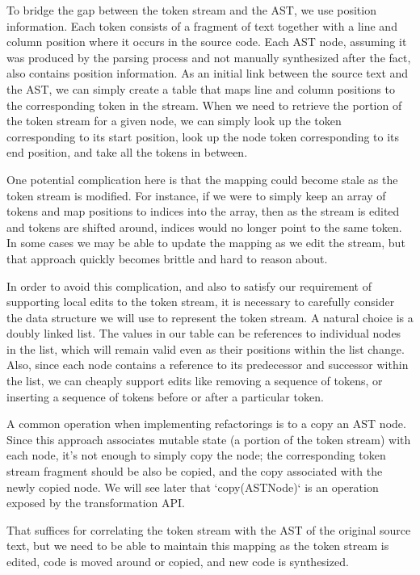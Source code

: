 To bridge the gap between the token stream and the AST, we use position
information. Each token consists of a fragment of text together with a line and
column position where it occurs in the source code. Each AST node, assuming it
was produced by the parsing process and not manually synthesized after the
fact, also contains position information. As an initial link between the source
text and the AST, we can simply create a table that maps line and column
positions to the corresponding token in the stream. When we need to retrieve
the portion of the token stream for a given node, we can simply look up the
token corresponding to its start position, look up the node token corresponding
to its end position, and take all the tokens in between.

One potential complication here is that the mapping could become stale as the
token stream is modified. For instance, if we were to simply keep an array of
tokens and map positions to indices into the array, then as the stream is
edited and tokens are shifted around, indices would no longer point to the same
token. In some cases we may be able to update the mapping as we edit the
stream, but that approach quickly becomes brittle and hard to reason about.

In order to avoid this complication, and also to satisfy our requirement of
supporting local edits to the token stream, it is necessary to carefully
consider the data structure we will use to represent the token stream. A
natural choice is a doubly linked list. The values in our table can be
references to individual nodes in the list, which will remain valid even as
their positions within the list change. Also, since each node contains a
reference to its predecessor and successor within the list, we can cheaply
support edits like removing a sequence of tokens, or inserting a sequence of
tokens before or after a particular token.

A common operation when implementing refactorings is to a copy an AST
node. Since this approach associates mutable state (a portion of the token
stream) with each node, it's not enough to simply copy the node; the
corresponding token stream fragment should be also be copied, and the copy
associated with the newly copied node. We will see later that `copy(ASTNode)`
is an operation exposed by the transformation API.

That suffices for correlating the token stream with the AST of the original
source text, but we need to be able to maintain this mapping as the token
stream is edited, code is moved around or copied, and new code is synthesized.

